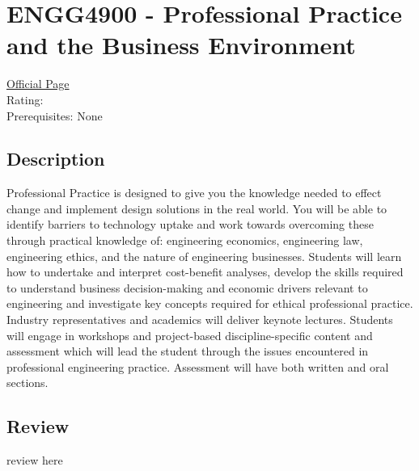 \hypertarget{ENGG4900}{\section{ENGG4900 - Professional Practice and the Business Environment}}

\large
\textcolor{turbo_purple}{\href{https://my.uq.edu.au/programs-courses/course.html?course_code=ENGG4900}{Official Page}} \\
Rating: \cstar\cstar\cstar\cstar\ostar \\
Prerequisites: None

\normalsize
\subsection*{Description}
Professional Practice is designed to give you the knowledge needed to effect change and implement design solutions in the real world.
You will be able to identify barriers to technology uptake and work towards overcoming these through practical knowledge of: engineering economics, engineering law, engineering ethics, and the nature of engineering businesses.
Students will learn how to undertake and interpret cost-benefit analyses, develop the skills required to understand business decision-making and economic drivers relevant to engineering and investigate key concepts required for ethical professional practice.
Industry representatives and academics will deliver keynote lectures.
Students will engage in workshops and project-based discipline-specific content and assessment which will lead the student through the issues encountered in professional engineering practice.
Assessment will have both written and oral sections.

\subsection*{Review}
review here
